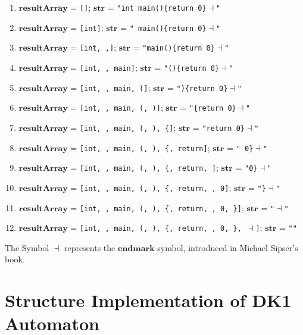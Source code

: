 \begin{enumerate}
    \item \(\boldsymbol{resultArray}\) = \texttt{[]}; \hfill \(\boldsymbol{str}\) = \texttt{"int main()\{return 0\}\( \dashv \)"}
    \item \(\boldsymbol{resultArray}\) = \texttt{[int]}; \hfill \(\boldsymbol{str}\) = \texttt{" main()\{return 0\}\( \dashv \)"}
    \item \(\boldsymbol{resultArray}\) = \texttt{[int,  ,]}; \hfill \(\boldsymbol{str}\) = \texttt{"main()\{return 0\}\( \dashv \)"}
    \item \(\boldsymbol{resultArray}\) = \texttt{[int,  , main]}; \hfill \(\boldsymbol{str}\) = \texttt{"()\{return 0\}\( \dashv \)"}
    \item \(\boldsymbol{resultArray}\) = \texttt{[int,  , main, (]}; \hfill \(\boldsymbol{str}\) = \texttt{")\{return 0\}\( \dashv \)"}
    \item \(\boldsymbol{resultArray}\) = \texttt{[int,  , main, (, )]}; \hfill \(\boldsymbol{str}\) = \texttt{"\{return 0\}\( \dashv \)"}
    \item \(\boldsymbol{resultArray}\) = \texttt{[int,  , main, (, ), \{]}; \hfill \(\boldsymbol{str}\) = \texttt{"return 0\}\( \dashv \)"}
    \item \(\boldsymbol{resultArray}\) = \texttt{[int,  , main, (, ), \{, return]}; \hfill \(\boldsymbol{str}\) = \texttt{" 0\}\( \dashv \)"}
    \item \(\boldsymbol{resultArray}\) = \texttt{[int,  , main, (, ), \{, return,  ]}; \hfill \(\boldsymbol{str}\) = \texttt{"0\}\( \dashv \)"}
    \item \(\boldsymbol{resultArray}\) = \texttt{[int,  , main, (, ), \{, return,  , 0]}; \hfill \(\boldsymbol{str}\) = \texttt{"\}\( \dashv \)"}
    \item \(\boldsymbol{resultArray}\) = \texttt{[int,  , main, (, ), \{, return,  , 0, \}]}; \hfill \(\boldsymbol{str}\) = \texttt{"\( \dashv \)"}
    \item \(\boldsymbol{resultArray}\) = \texttt{[int,  , main, (, ), \{, return,  , 0, \}, \( \dashv \)]}; \hfill \(\boldsymbol{str}\) = \texttt{""}
\end{enumerate}

The Symbol \( \dashv \) represents the \(\boldsymbol{endmark}\) symbol, introduced in Michael Sipser's book.

\newpage


\section{Structure Implementation of DK1 Automaton}\label{sec:Structure Implementation of DK1 Automaton}